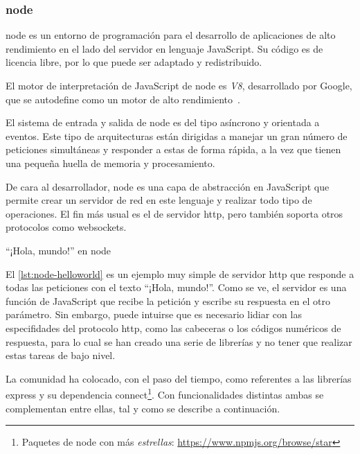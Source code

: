 \documentclass[main]{subfiles}
\begin{document}
\subsubsection[Node.js]{\Gls{node}}
\Gls{node} es un entorno de programación para el desarrollo de aplicaciones de alto rendimiento en el lado del servidor en lenguaje JavaScript. Su código es de licencia libre, por lo que puede ser adaptado y redistribuido.

El motor de interpretación de JavaScript de \gls{node} es \emph{V8}, desarrollado por Google, que se autodefine como un motor de alto rendimiento~\autocite{googlev8}.

El sistema de entrada y salida de \gls{node} es del tipo asíncrono y orientada a eventos\autocite{understandingeventdriven}. Este tipo de arquitecturas están dirigidas a manejar un gran número de peticiones simultáneas y responder a estas de forma rápida, a la vez que tienen una pequeña huella de memoria y procesamiento.

De cara al desarrollador, \gls{node} es una capa de abstracción en JavaScript que permite crear un servidor de red en este lenguaje y realizar todo tipo de operaciones. El fin más usual es el de servidor \gls{http}, pero también soporta otros protocolos como \gls{websockets}.

\begin{listing}
  \caption[\enquote{¡Hola, mundo!} en \gls*{node}]{\enquote{¡Hola, mundo!} en \gls{node}}
  \label{lst:node-helloworld}
\end{listing}

El \cref{lst:node-helloworld} es un ejemplo muy simple de servidor \gls{http} que responde a todas las peticiones con el texto \enquote{¡Hola, mundo!}. Como se ve, el servidor es una función de JavaScript que recibe la petición y escribe su respuesta en el otro parámetro. Sin embargo, puede intuirse que es necesario lidiar con las especifidades del protocolo \gls{http}, como las cabeceras o los códigos numéricos de respuesta, para lo cual se han creado una serie de librerías y no tener que realizar estas tareas de bajo nivel.

La comunidad ha colocado, con el paso del tiempo, como referentes a las librerías \gls{express} y su dependencia \gls{connect}\footnote{Paquetes de \gls{node} con más \emph{estrellas}: \url{https://www.npmjs.org/browse/star}}. Con funcionalidades distintas ambas se complementan entre ellas, tal y como se describe a continuación.
\end{document}
